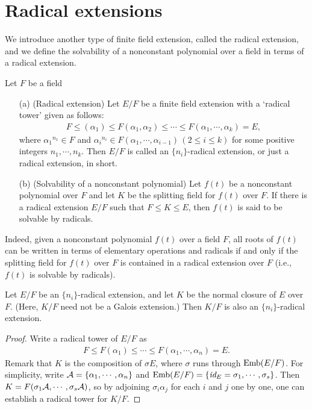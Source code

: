 \section{Radical extensions}

We introduce another type of finite field extension, called the radical extension, and we define the solvability of a nonconstant polynomial over a field in terms of a radical extension.
\begin{defi}
    Let $F$ be a field
    \begin{enumerate}
        \item[(a)]
        {
            (Radical extension)
            Let $E/F$ be a finite field extension with a `radical tower' given as follows:
            \begin{align*}
                F\leq (\alpha_1)\leq F(\alpha_1, \alpha_2)\leq \cdots\leq F(\alpha_1, \cdots, \alpha_k)=E,
            \end{align*}
            where ${\alpha_1}^{n_1}\in F$ and ${\alpha_i}^{n_i}\in F(\alpha_1, \cdots, \alpha_{i-1})\,(2\leq i\leq k)$ for some positive integers $n_1, \cdots, n_k$.
            Then $E/F$ is called an $\{n_i\}$-radical extension, or just a radical extension, in short.
        }
        \item[(b)]
        {
            (Solvability of a nonconstant polynomial)
            Let $f(t)$ be a nonconstant polynomial over $F$ and let $K$ be the splitting field for $f(t)$ over $F$.
            If there is a radical extension $E/F$ such that $F\leq K\leq E$, then $f(t)$ is said to be solvable by radicals.
        }
    \end{enumerate}
\end{defi}
\begin{rmk}
    Indeed, given a nonconstant polynomial $f(t)$ over a field $F$, all roots of $f(t)$ can be written in terms of elementary operations and radicals if and only if the splitting field for $f(t)$ over $F$ is contained in a radical extension over $F$ (i.e., $f(t)$ is solvable by radicals).
\end{rmk}

\begin{obs}
    Let $E/F$ be an $\{n_i\}$-radical extension, and let $K$ be the normal closure of $E$ over $F$. (Here, $K/F$ need not be a Galois extension.)
    Then $K/F$ is also an $\{n_i\}$-radical extension.
\end{obs}
\begin{proof}
    Write a radical tower of $E/F$ as
    \begin{align*}
        F\leq F(\alpha_1)\leq \cdots\leq F(\alpha_1, \cdots, \alpha_n)=E.
    \end{align*}
    Remark that $K$ is the composition of $\sigma E$, where $\sigma$ runs through ${\textrm{Emb}({E/F})}$.
    For simplicity, write ${\mathcal{A}}=\{\alpha_1, \cdots, \alpha_n\}$ and ${\textrm{Emb}({E/F})}=\{\textit{id}_{E}=\sigma_1, \cdots, \sigma_s\}$.
    Then $K=F(\sigma_1{\mathcal{A}}, \cdots, \sigma_s{\mathcal{A}})$, so by adjoining $\sigma_i\alpha_j$ for each $i$ and $j$ one by one, one can establish a radical tower for $K/F$.
\end{proof}

